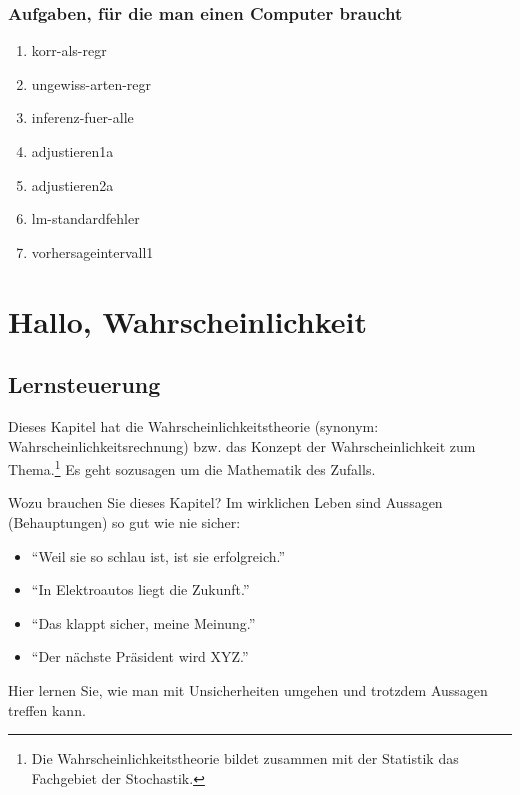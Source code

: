 \documentclass[
  ngerman,
  letterpaper,
  twoside,
  open=any]{scrbook}
\providecommand{\tightlist}{%
  \setlength{\itemsep}{0pt}\setlength{\parskip}{0pt}}\usepackage{longtable,booktabs,array}
\theoremstyle{definition}
\theoremstyle{plain}
\theoremstyle{definition}
\theoremstyle{definition}
\theoremstyle{definition}
\theoremstyle{definition}
\theoremstyle{remark}
\begin{document}
\subsection{Aufgaben, für die man einen Computer
braucht}\label{aufgaben-fuxfcr-die-man-einen-computer-braucht}

\begin{enumerate}
\def\labelenumi{\arabic{enumi}.}
\tightlist
\item
  korr-als-regr
\item
  ungewiss-arten-regr
\item
  inferenz-fuer-alle
\item
  adjustieren1a
\item
  adjustieren2a
\item
  lm-standardfehler
\item
  vorhersageintervall1
\end{enumerate}

\chapter{Hallo, Wahrscheinlichkeit}\label{hallo-wahrscheinlichkeit}

\section{Lernsteuerung}\label{lernsteuerung-2}

Dieses Kapitel hat die Wahrscheinlichkeitstheorie (synonym:
Wahrscheinlichkeitsrechnung) bzw. das Konzept der Wahrscheinlichkeit zum
Thema.\footnote{Die Wahrscheinlichkeitstheorie bildet zusammen mit der
  Statistik das Fachgebiet der Stochastik.} Es geht sozusagen um die
Mathematik des Zufalls.

Wozu brauchen Sie dieses Kapitel? Im wirklichen Leben sind Aussagen
(Behauptungen) so gut wie nie sicher:

\begin{itemize}
\tightlist
\item
  \enquote{Weil sie so schlau ist, ist sie erfolgreich.}
\item
  \enquote{In Elektroautos liegt die Zukunft.}
\item
  \enquote{Das klappt sicher, meine Meinung.}
\item
  \enquote{Der nächste Präsident wird XYZ.}
\end{itemize}

Hier lernen Sie, wie man mit Unsicherheiten umgehen und trotzdem
Aussagen treffen kann.
\end{document}
